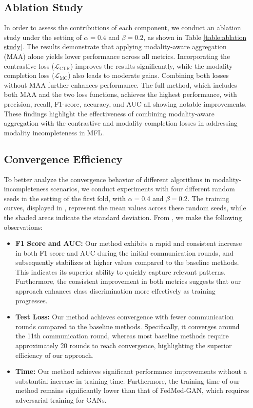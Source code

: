 \subsection{Ablation Study}

 In order to assess the contributions of each component, we conduct an ablation study under the setting of $\alpha = 0.4$ and $\beta = 0.2$, as shown in Table \ref{table:ablation study}. The results demonstrate that applying modality-aware aggregation (MAA) alone yields lower performance across all metrics. Incorporating the contrastive loss ($\mathcal{L}_{\text{CTR}}$) improves the results significantly, while the modality completion loss ($\mathcal{L}_{\text{MC}}$) also leads to moderate gains. Combining both losses without MAA further enhances performance. The full method, which includes both MAA and the two loss functions, achieves the highest performance, with precision, recall, F1-score, accuracy, and AUC all showing notable improvements. These findings highlight the effectiveness of combining modality-aware aggregation with the contrastive and modality completion losses in addressing modality incompleteness in MFL.

\subsection{Convergence Efficiency}

To better analyze the convergence behavior of different algorithms in modality-incompleteness scenarios, we conduct experiments with four different random seeds in the setting of the first fold, with $\alpha = 0.4$ and $\beta = 0.2$. The training curves, displayed in , represent the mean values across these random seeds, while the shaded areas indicate the standard deviation. From , we make the following observations:

\begin{itemize}
    \item \textbf{F1 Score and AUC:} Our method exhibits a rapid and consistent increase in both F1 score and AUC during the initial communication rounds, and subsequently stabilizes at higher values compared to the baseline methods. This indicates its superior ability to quickly capture relevant patterns. Furthermore, the consistent improvement in both metrics suggests that our approach enhances class discrimination more effectively as training progresses.
    \item \textbf{Test Loss:} Our method achieves convergence with fewer communication rounds compared to the baseline methods. Specifically, it converges around the 11th communication round, whereas most baseline methods require approximately 20 rounds to reach convergence, highlighting the superior efficiency of our approach.
    \item \textbf{Time:} Our method achieves significant performance improvements without a substantial increase in training time. Furthermore, the training time of our method remains significantly lower than that of FedMed-GAN, which requires adversarial training for GANs.
\end{itemize}
